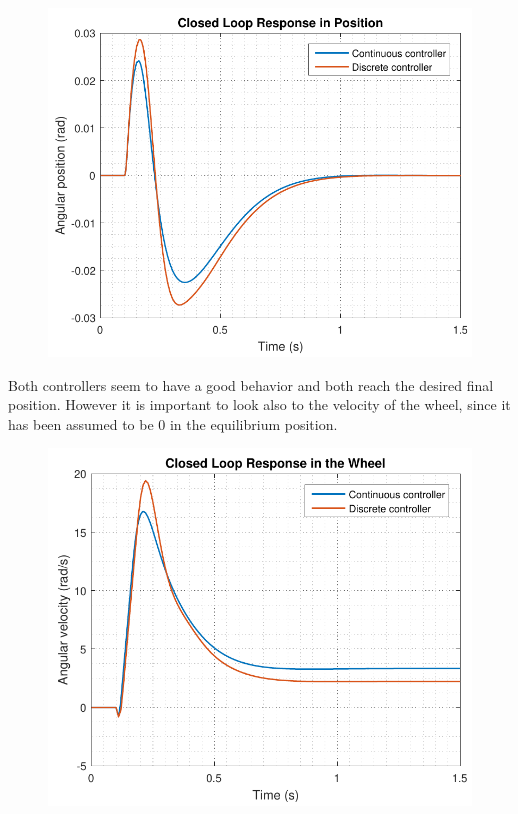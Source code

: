 \hspace{0.03\linewidth}
\begin{minipage}{0.45\linewidth}
    \begin{figure}[H]\vspace{-4mm}
      \includegraphics[scale=.53]{figures/positionComp}
      \captionsetup{justification=centering}
      \label{discreteVsContinuousSimulation}
    \end{figure}\vspace{-5mm}
\end{minipage}

Both controllers seem to have a good behavior and both reach the desired final position. However it is important to look also to the velocity of the wheel, since it has been assumed to be 0 in the equilibrium position.
%
\begin{figure}[H]\vspace{-4mm}
	\centering
	\includegraphics[scale=.53]{figures/wheelComp}
   \label{fig:discreteVsContinuousWheel}
\end{figure}\vspace{-5mm}

